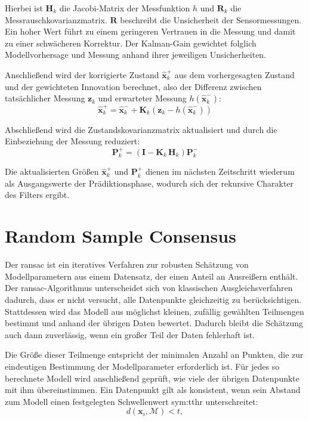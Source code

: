 Hierbei ist $\mathbf{H}_k$ die Jacobi-Matrix der Messfunktion $h$ und $\mathbf{R}_k$ die Messrauschkovarianzmatrix.
$\mathbf{R}$ beschreibt die Unsicherheit der Sensormessungen. 
Ein hoher Wert führt zu einem geringeren Vertrauen in die Messung und damit zu einer schwächeren Korrektur.
Der Kalman-Gain gewichtet folglich Modellvorhersage und Messung anhand ihrer jeweiligen Unsicherheiten.

Anschließend wird der korrigierte Zustand $\hat{\mathbf{x}}_k^{+}$ aus dem vorhergesagten Zustand und der gewichteten Innovation berechnet, also der Differenz zwischen tatsächlicher Messung $\mathbf{z}_k$ und erwarteter Messung $h(\hat{\mathbf{x}}_k^{-})$:
\begin{equation}
    \hat{\mathbf{x}}_k^{+} = \hat{\mathbf{x}}_k^{-} + \mathbf{K}_k\left(\mathbf{z}_k - h\left(\hat{\mathbf{x}}_k^{-}\right)\right)
\end{equation}

Abschließend wird die Zustandskovarianzmatrix aktualisiert und durch die Einbeziehung der Messung reduziert:
\begin{equation}
    \mathbf{P}_k^{+} = \left(\mathbf{I} - \mathbf{K}_k\,\mathbf{H}_k\right)\mathbf{P}_k^{-}
\end{equation}

Die aktualisierten Größen $\hat{\mathbf{x}}_k^{+}$ und $\mathbf{P}_k^{+}$ dienen im nächsten Zeitschritt wiederum als Ausgangswerte der Prädiktionsphase, wodurch sich der rekursive Charakter des Filters ergibt.~\cite{Bang18}



\section{Random Sample Consensus}
\label{sec:ransac}
Der \gls{ransac} ist ein iteratives Verfahren zur robusten Schätzung von Modellparametern aus einem Datensatz, 
der einen Anteil an Ausreißern enthält.
Der \gls{ransac}-Algorithmus unterscheidet sich von klassischen Ausgleichsverfahren dadurch, dass er nicht versucht, 
alle Datenpunkte gleichzeitig zu berücksichtigen.
Stattdessen wird das Modell aus möglichst kleinen, zufällig gewählten Teilmengen bestimmt und anhand der übrigen Daten bewertet.
Dadurch bleibt die Schätzung auch dann zuverlässig, wenn ein großer Teil der Daten fehlerhaft ist.~\cite{RANSAC_Fischler1981}

Die Größe dieser Teilmenge entspricht der minimalen Anzahl an Punkten, die zur eindeutigen Bestimmung der Modellparameter erforderlich ist.
Für jedes so berechnete Modell wird anschließend geprüft, wie viele der übrigen Datenpunkte mit ihm übereinstimmen.
Ein Datenpunkt gilt als konsistent, wenn sein Abstand zum Modell einen festgelegten Schwellenwert \gls{sym:tthr} unterschreitet:
\begin{equation}
    d(\mathbf{x}_i, \mathcal{M}) < t,
    \label{eq:ransac_inlier}
\end{equation}


